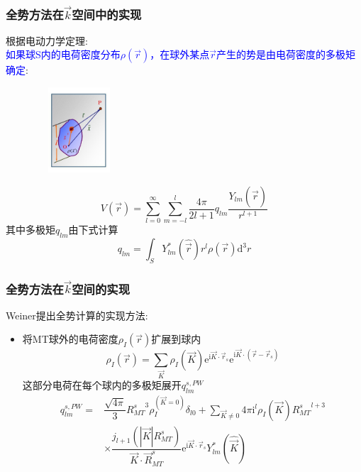 \frame
{
\frametitle{全势方法在$\vec k$空间中的实现}
根据电动力学定理:\\\textcolor{blue}{如果球\textrm{S}内的电荷密度分布$\rho(\vec r)$，在球外某点$\vec r$产生的势是由电荷密度的多极矩确定}:
\begin{figure}[h!]
\vspace*{-15pt}
\centering
\includegraphics[height=1.25in,width=1.32in,viewport=1 22 507 575,clip]{Figures/potential_multipole.jpg}
\label{Potential-multipole}
\end{figure}
\begin{displaymath}
	V(\vec r)=\sum_{l=0}^{\infty}\sum_{m=-l}^{l}\dfrac{4\pi}{2l+1}q_{lm}\dfrac{Y_{lm}(\hat{\vec r})}{r^{l+1}}
\end{displaymath}
其中多极矩$q_{lm}$由下式计算
\begin{displaymath}
	q_{lm}=\int_SY_{lm}^{\ast}(\hat{\vec r})r^l\rho(\vec r)\mathrm{d}^3r
\end{displaymath}
}

\frame
{
	\frametitle{全势方法在$\vec k$空间的实现}
\textrm{Weiner}提出全势计算的实现方法:~\\
\begin{itemize}
	\item 将\textrm{MT}球外的电荷密度$\rho_I(\vec r)$扩展到球内
	\begin{displaymath}
		\rho_I(\vec r)=\sum_{\vec K}\rho_I(\vec K)\mathrm{e}^{\mathrm{i}\vec K\cdot\vec r_s}\mathrm{e}^{\mathrm{i}\vec K\cdot(\vec r-\vec r_s)}
	\end{displaymath}
	这部分电荷在每个球内的多极矩展开$q_{lm}^{s,PW}$
	\begin{displaymath}
		\begin{aligned}
			q_{lm}^{s,PW}=&\dfrac{\sqrt{4\pi}}3{R_{MT}^s}^3\rho_I^{(\vec K=0)}\delta_{l0}+\sum_{\vec K\neq0}4\pi\mathrm{i}^l\rho_I(\vec K){R_{MT}^s}^{l+3}\\
			&\times\dfrac{j_{l+1}(|\vec K|R_{MT}^s)}{\vec K\cdot\vec R_{MT}^s}\mathrm{e}^{\mathrm{i}\vec K\cdot\vec r_s}Y_{lm}^{\ast}(\hat{\vec K})
		\end{aligned}
	\end{displaymath}
\end{itemize}
}

